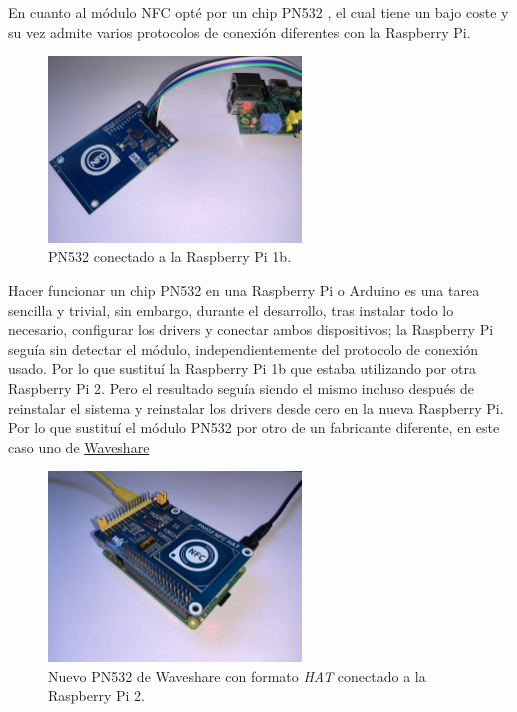En cuanto al módulo NFC opté por un chip PN532 \cite{raspberry-pn532}, el cual
tiene un bajo coste y su vez admite varios protocolos de conexión diferentes con
la Raspberry Pi.

\begin{figure}[htb]
    \centering
    \includegraphics[width=0.6\textwidth]{fotos/pn532_bad.jpeg}
    \caption{PN532 conectado a la Raspberry Pi 1b.}
\end{figure}

Hacer funcionar un chip PN532 en una Raspberry Pi o Arduino es una tarea
sencilla y trivial, sin embargo, durante el desarrollo, tras instalar todo lo
necesario, configurar los drivers y conectar ambos dispositivos; la Raspberry Pi
seguía sin detectar el módulo, independientemente del protocolo de conexión
usado. Por lo que sustituí la Raspberry Pi 1b que estaba utilizando por otra
Raspberry Pi 2. 
Pero el resultado seguía siendo el mismo incluso después de reinstalar el
sistema y reinstalar los drivers desde cero en la nueva Raspberry Pi. Por lo que
sustituí el módulo PN532 por otro de un fabricante diferente, en este caso uno de
\href{https://www.waveshare.com/wiki/PN532_NFC_HAT}{Waveshare}

\begin{figure}[htb]
    \centering
    \includegraphics[width=0.6\textwidth]{fotos/pn532_good.jpeg}
    \caption{Nuevo PN532 de Waveshare con formato \emph{HAT} conectado a la Raspberry Pi 2.}
\end{figure}


